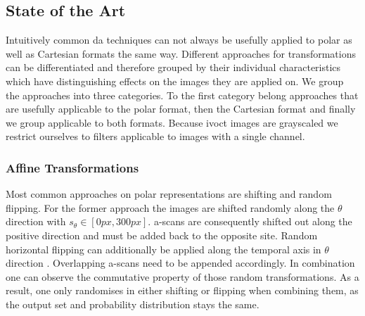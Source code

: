 \subsection{State of the Art}
Intuitively common \acrshort{da} techniques can not always be usefully applied to polar as well as Cartesian formats the same way. Different approaches for transformations can be differentiated and therefore grouped by their individual characteristics which have distinguishing effects on the images they are applied on. We group the approaches into three categories. To the first category belong approaches that are usefully applicable to the polar format, then the Cartesian format and finally we group applicable to both formats. Because \acrshort{ivoct} images are grayscaled we restrict ourselves to filters applicable to images with a single channel.

\subsubsection{Affine Transformations}

Most common approaches on polar representations are shifting \cite{Kuwayama.2019, Kihara.2019} and random flipping. For the former approach the images are shifted randomly along the \( \theta \) direction with \( s_{\theta} \in [0 px, 300 px] \). \Glspl{a-scan} are consequently shifted out along the positive direction and must be added back to the opposite site. Random horizontal flipping can additionally be applied along the temporal axis in \( \theta \) direction \cite{Devalla.2018, KunGao.2019, Kihara.2019, Gessert.2018, Gessert.2019}. Overlapping \Glspl{a-scan} need to be appended accordingly. In combination one can observe the commutative property of those random transformations. As a result, one only randomises in either shifting or flipping when combining them, as the output set and probability distribution stays the same.

